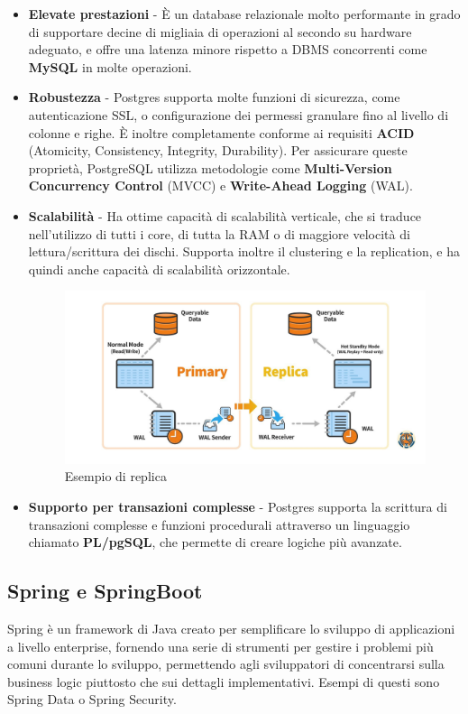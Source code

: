 \begin{itemize}
  \item \textbf{Elevate prestazioni} - \`E un database relazionale molto performante in grado di supportare decine di migliaia di operazioni al secondo su hardware adeguato,
    e offre una latenza minore rispetto a DBMS concorrenti come \textbf{MySQL} in molte operazioni.\cite{salunke2024performance}
  \item \textbf{Robustezza} - Postgres supporta molte funzioni di sicurezza, come autenticazione SSL, o configurazione dei permessi granulare fino al
    livello di colonne e righe.
    \`E inoltre completamente conforme ai requisiti \textbf{ACID} (Atomicity, Consistency, Integrity, Durability).
    Per assicurare queste propriet\`a, PostgreSQL utilizza metodologie come \textbf{Multi-Version Concurrency Control} (MVCC) e \textbf{Write-Ahead Logging} (WAL).
  \item \textbf{Scalabilit\`a} - Ha ottime capacit\`a di scalabilit\`a verticale, che si traduce nell'utilizzo di tutti i core,
    di tutta la RAM o di maggiore velocit\`a di lettura/scrittura dei dischi.
    Supporta inoltre il clustering e la replication, e ha quindi anche capacit\`a di scalabilit\`a orizzontale.
    \begin{figure}[H]
      \centering
      \includegraphics[width=15cm]{images/postgres-replication.png}
      \caption{Esempio di replica\cite{postgreshighavail}}
    \end{figure}
  \item \textbf{Supporto per transazioni complesse} - Postgres supporta la scrittura di transazioni complesse e funzioni procedurali attraverso un linguaggio chiamato
    \textbf{PL/pgSQL}, che permette di creare logiche pi\`u avanzate.
\end{itemize}
\subsection {Spring e SpringBoot}
Spring \`e un framework di Java creato per semplificare lo sviluppo di applicazioni a livello enterprise, fornendo una serie di strumenti per gestire i problemi pi\`u comuni
durante lo sviluppo, permettendo agli sviluppatori di concentrarsi sulla business logic piuttosto che sui dettagli implementativi.
Esempi di questi sono Spring Data o Spring Security.

